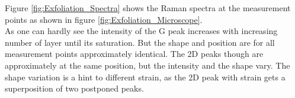 \documentclass[%
 reprint,
amsmath,amssymb,
pra,
]{revtex4-1}
\begin{document}
Figure \ref{fig:Exfoliation_Spectra} shows the Raman spectra at the measurement points as shown in figure \ref{fig:Exfoliation_Microscope}. \\
As one can hardly see the intensity of the G peak increases with increasing number of layer until its saturation. But the shape and position are for all measurement points approximately identical. The 2D peaks though are approximately at the same position, but the intensity and the shape vary. The shape variation is a hint to different strain, as the 2D peak with strain gets a superposition of two postponed peaks. 






















\end{document}
